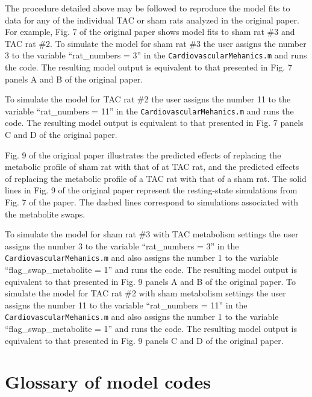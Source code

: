 \documentclass[fleqn,10pt]{physiome}
\begin{document}
The procedure detailed above may be followed to reproduce the model fits to data for any of the individual TAC or sham rats analyzed in the original paper. For example, Fig. 7 of the original paper shows model fits to sham rat \#3 and TAC rat \#2. To simulate the model for sham rat \#3 the user assigns the number 3 to the variable ``rat\_numbers = 3'' in the \texttt{CardiovascularMehanics.m} and runs the code. The resulting model output is equivalent to that presented in Fig. 7 panels A and B of the original paper.

To simulate the model for TAC rat \#2 the user assigns the number 11 to the variable ``rat\_numbers = 11'' in the \texttt{CardiovascularMehanics.m} and runs the code. The resulting model output is equivalent to that presented in Fig. 7 panels C and D of the original paper.

Fig. 9 of the original paper illustrates the predicted effects of replacing
the metabolic profile of sham rat with that of at TAC rat, and the predicted effects of replacing the metabolic profile of a TAC rat with that of a sham rat. The solid lines in Fig. 9 of the original paper represent the resting-state simulations from Fig. 7 of the paper. The dashed lines correspond to simulations associated with the metabolite swaps. 

To simulate the model for sham rat \#3 with TAC metabolism settings the user assigns the number 3 to the variable ``rat\_numbers = 3'' in the \texttt{CardiovascularMehanics.m} and also assigns the number 1 to the variable ``flag\_swap\_metabolite = 1'' and runs the code. The resulting model output is equivalent to that presented in Fig. 9 panels A and B of the original paper. To simulate the model for TAC rat \#2 with sham metabolism settings the user assigns the number 11 to the variable ``rat\_numbers = 11'' in the \texttt{CardiovascularMehanics.m} and also assigns the number 1 to the variable ``flag\_swap\_metabolite = 1'' and runs the code. The resulting model output is equivalent to that presented in Fig. 9 panels C and D of the original paper.

\section{Glossary of model codes}
\end{document}
